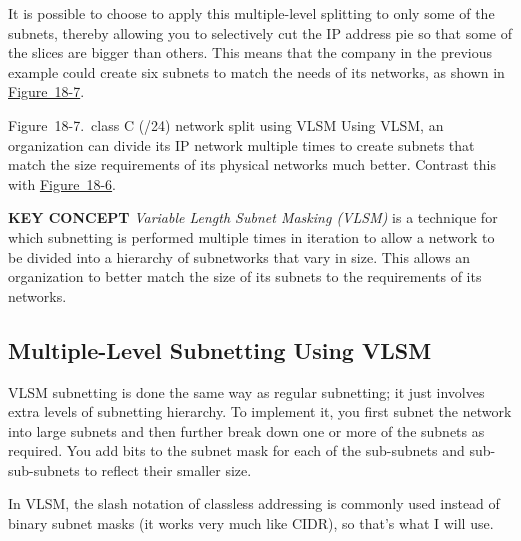 It is possible to choose to apply this multiple-level splitting to only
some of the subnets, thereby allowing you to selectively cut the IP
address pie so that some of the slices are bigger than others. This
means that the company in the previous example could create six subnets
to match the needs of its networks, as shown in
\protect\hyperlink{ch18s08.htmlux5cux23class_c_24_network_split_using_vlsm_usin}{Figure~18-7}.

\protect\hypertarget{ch18s08.htmlux5cux23class_c_24_network_split_using_vlsm_usin}{}{}

\protect\hypertarget{ch18s08.htmlux5cux23I_mediaobject4_d1e20449}{}{}

Figure~18-7.~class C (/24) network split using VLSM Using VLSM, an
organization can divide its IP network multiple times to create subnets
that match the size requirements of its physical networks much better.
Contrast this with
\protect\hyperlink{ch18s08.htmlux5cux23class_c_24_network_split_into_eight_conv}{Figure~18-6}.


\protect\hypertarget{ch18s08.htmlux5cux23idx-CHP-18-0744}{}{}{\textbf{KEY
CONCEPT}} {\emph{Variable Length Subnet Masking (VLSM)}} is a technique
for which subnetting is performed multiple times in iteration to allow a
network to be divided into a hierarchy of subnetworks that vary in size.
This allows an organization to better match the size of its subnets to
the requirements of its networks.

\subsection[Multiple-Level Subnetting Using
VLSM]{\texorpdfstring{\protect\hypertarget{ch18s08.htmlux5cux23multiple-level_subnetting_using_vlsm}{}{}Multiple-Level
Subnetting Using VLSM}{Multiple-Level Subnetting Using VLSM}}

VLSM subnetting is done the same way as regular subnetting; it just
involves extra levels of subnetting hierarchy. To implement it, you
first subnet the network into large subnets and then further break down
one or more of the subnets as required. You add bits to the subnet mask
for each of the sub-subnets and sub-sub-subnets to reflect their smaller
size.

In VLSM, the slash notation of classless addressing is commonly used
instead of binary subnet masks (it works very much like CIDR), so that's
what I will use.

